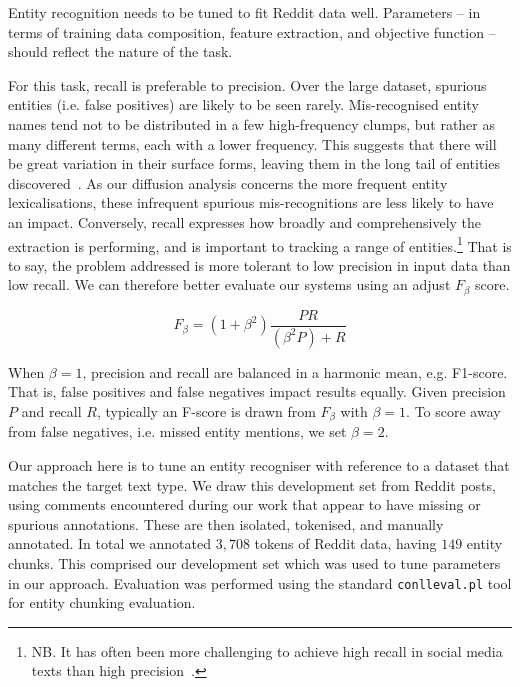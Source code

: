 \documentclass[sigconf,anonymous,review]{acmart}
\begin{document}
Entity recognition needs to be tuned to fit Reddit data well.
Parameters -- in terms of training data composition, feature extraction, and objective function -- should reflect the nature of the task.

For this task, recall is preferable to precision.
Over the large dataset, spurious entities (i.e. false positives) are likely to be seen rarely.
Mis-recognised entity names tend not to be distributed in a few high-frequency clumps, but rather as many different terms, each with a lower frequency.
This suggests that there will be great variation in their surface forms, leaving them in the long tail of entities discovered~\cite{leginus2015enhanced}.
As our diffusion analysis concerns the more frequent entity lexicalisations, these infrequent spurious mis-recognitions are less likely to have an impact.
Conversely, recall expresses how broadly and comprehensively the extraction is performing, and is important to tracking a range of entities.\footnote{NB. It has often been more challenging to achieve high recall in social media texts than high precision~\cite{ritter2011named,derczynski2015analysis}.}
That is to say, the problem addressed is more tolerant to low precision in input data than low recall.
We can therefore better evaluate our systems using an adjust $F_\beta$ score.

\begin{equation}
F_\beta = (1+\beta^2)\frac{PR}{(\beta^2 P) + R} 
\end{equation}

When $\beta=1$, precision and recall are balanced in a harmonic mean, e.g. F1-score.
That is, false positives and false negatives impact results equally.
Given precision $P$ and recall $R$, typically an F-score is drawn from $F_\beta$ with $\beta=1$.
To score away from false negatives, i.e. missed entity mentions, we set $\beta=2$.

Our approach here is to tune an entity recogniser with reference to a dataset that matches the target text type.
We draw this development set from Reddit posts, using comments encountered during our work that appear to have missing or spurious annotations.
These are then isolated, tokenised, and manually annotated.
In total we annotated $3,708$ tokens of Reddit data, having $149$ entity chunks.
This comprised our development set which was used to tune parameters in our approach.
Evaluation was performed using the standard {\tt \small conlleval.pl} tool for entity chunking evaluation.
\end{document}
